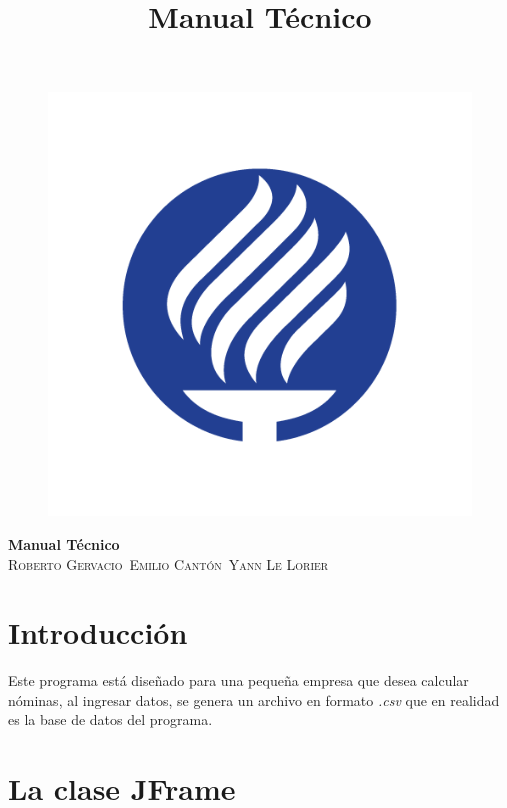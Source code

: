 \documentclass[12pt]{article}
\title{Manual T\'ecnico}
\author{}
\date{}
\begin{document}
\begin{titlepage}
	\begin{center}
		\begin{figure}
			\includegraphics[width=145mm]{Tec.jpg}
			\label{fig:Tec}
		\end{figure}
	\huge{\bfseries{Manual T\'ecnico}}\\
	\textsc{\small{Roberto Gervacio}}\
	\textsc{\small{Emilio Cant\'on}}\
	\textsc{\small{Yann Le Lorier}}\
	\end{center}
\end{titlepage}
\maketitle
\tableofcontents

\section{Introducci\'on}
{Este programa est\'a dise\~nado para una peque\~na empresa que desea calcular n\'ominas, al ingresar datos, se genera un archivo en formato \textit{.csv} que en realidad es la base de datos del programa.}

\section{La clase JFrame}
\end{document}

